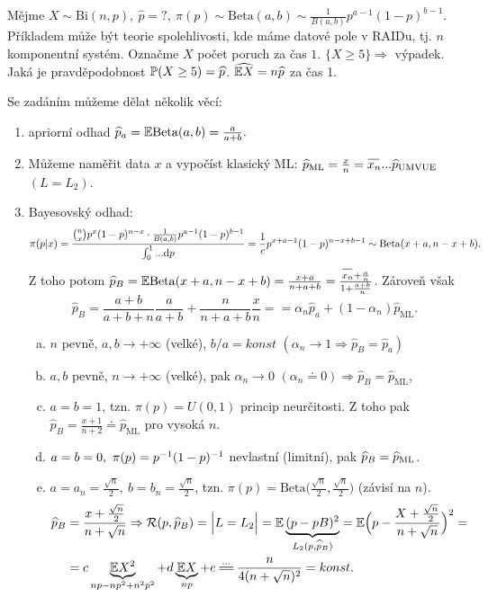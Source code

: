 \begin{remark}
	Mějme $X\sim \mathrm{Bi}(n,p),~\widehat{p}=?,~\pi(p)\sim\mathrm{Beta}(a,b)\sim\frac{1}{B(a,b)}p^{a-1}(1-p)^{b-1}$. Příkladem může být teorie spolehlivosti, kde máme datové pole v RAIDu, tj. $n$ komponentní systém. Označme $X$ počet poruch za čas $1$. $\{X\geq5\}\Rightarrow$ výpadek. Jaká je pravděpodobnost $\mathbb{P}(X\geq5)=\widehat{p}$. $\widehat{\mathbb{E} X}=n\widehat{p}$ za čas 1.
	
	Se zadáním můžeme dělat několik věcí:\begin{enumerate}[1)]
		\item apriorní odhad $\widehat{p}_a=\mathbb{E}\mathrm{Beta}(a,b)=\frac{a}{a+b}.$
		\item Můžeme naměřit data $x$ a vypočíst klasický ML: $\widehat{p}_\mathrm{ML}=\frac{x}{n}=\oxnn ... \widehat{p}_\mathrm{UMVUE}$ $(L=L_2)$.
		\item Bayesovský odhad: $$\pi(p|x)=\frac{\binom{n}{x}p^x(1-p)^{n-x}\cdot\frac{1}{B(a,b)}p^{a-1}(1-p)^{b-1}}{\int_{0}^{1}...\mathrm{d} p}=\frac{1}{c}p^{x+a-1}(1-p)^{n-x+b-1}\sim\mathrm{Beta}(x+a,n-x+b).$$
		Z toho potom $\widehat{p}_B=\E \mathrm{Beta}(x+a,n-x+b)=\frac{x+a}{n+a+b}=\frac{\oxnn+\frac{a}{n}}{1+\frac{a+b}{n}}$. Zároveň však
		$$ \widehat{p}_B=\frac{a+b}{a+b+n}\frac{a}{a+b}+\frac{n}{n+a+b}\frac{x}{n}==\alpha_n\widehat{p}_a+(1-\alpha_n)\widehat{p}_\mathrm{ML}.$$
		\begin{enumerate}[a)]
			\item $n$ pevně, $a,b\to+\infty$ (velké), $b/a=konst$ $(\alpha_n\to1\Rightarrow\widehat{p}_B=\widehat{p}_a)$
			\item $a,b$ pevně, $n\to+\infty$ (velké), pak $\alpha_n\to0$ $(\alpha_n\doteq0)\Rightarrow\widehat{p}_B=\widehat{p}_\mathrm{ML}$,
			\item $a=b=1$, tzn. $\pi(p)=U(0,1)$ princip neurčitosti. Z toho pak $\widehat{p}_B=\frac{x+1}{n+2}\doteq \widehat{p}_\mathrm{ML}$ pro vysoká $n$.
			\item $a=b=0,~\pi(p)=p^{-1}(1-p)^{-1}$ nevlastní (limitní), pak $\widehat{p}_B=\widehat{p}_\mathrm{ML}$.
			\item $a=a_n=\frac{\sqrt{n}}{2},~b=b_n=\frac{\sqrt{n}}{2}$, tzn. $\pi(p)=\mathrm{Beta}\big(\frac{\sqrt{n}}{2},\frac{\sqrt{n}}{2}\big)$ (závisí na $n$).
			\[
			\begin{split}
			\pB&=\frac{x+\frac{\sqrt{n}}{2}}{n+\sqrt{n}}\Rightarrow \RF(p,\pB)=\Big|L=L_2\Big|=\E \underbrace{(p-pB)^2}_{L_2(p,\pB)}=\E\Big(p-\frac{X+\frac{\sqrt{n}}{2}}{n+\sqrt{n}}\Big)^2=\\&=c\underbrace{\E X^2}_{np-np^2+n^2p^2}+d \underbrace{\E X}_{np}+e\equal{...}\frac{n}{4(n+\sqrt{n})^2}=konst.

\end{split}\]
\end{enumerate}
\end{enumerate}
\end{remark}
